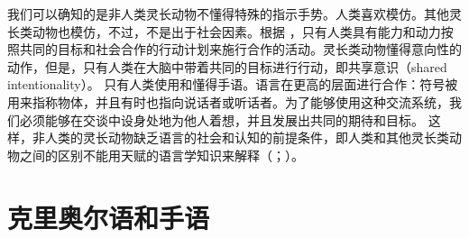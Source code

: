 我们可以确知的是非人类灵长动物不懂得特殊的指示手势。人类喜欢模仿。其他灵长类动物也模仿，不过，不是出于社会因素\citep[--10]{Tomasello2006c}。根据 \citet[]{TCCBM2005a}，只有人类具有能力和动力按照共同的目标和社会合作的行动计划来施行合作的活动。灵长类动物懂得意向性的动作，但是，只有人类在大脑中带着共同的目标进行行动，即共享意识（shared intentionality）。
只有人类使用和懂得手语\citep[, 724, 726]{TCCBM2005a}。语言在更高的层面进行合作：符号被用来指称物体，并且有时也指向说话者或听话者。为了能够使用这种交流系统，我们必须能够在交谈中设身处地为他人着想，并且发展出共同的期待和目标\citep[]{TCCBM2005a}。
这样，非人类的灵长动物缺乏语言的社会和认知的前提条件，即人类和其他灵长类动物之间的区别不能用天赋的语言学知识来解释（\citealp[\S~8.1.2]{Tomasello2003a}；\citealp{TCCBM2005a}）。

\section{克里奥尔语和手语}

